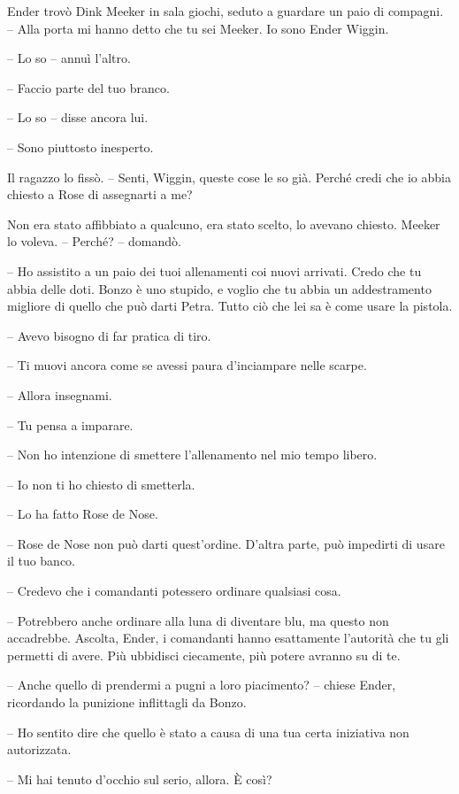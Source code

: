{Ender trovò Dink Meeker in sala giochi, seduto a guardare un paio di
	compagni. -- Alla porta mi hanno detto che tu sei Meeker. Io sono Ender
	Wiggin.}

{-- Lo so -- annuì l'altro.}

{-- Faccio parte del tuo branco.}

{-- Lo so -- disse ancora lui.}

{-- Sono piuttosto inesperto.}

{Il ragazzo lo fissò. -- Senti, Wiggin, queste cose le so già. Perché
	credi che io abbia chiesto a Rose di assegnarti a me?}

{Non era stato affibbiato a qualcuno, era stato scelto, lo avevano
	chiesto. Meeker lo voleva. -- Perché? -- domandò.}

{-- Ho assistito a un paio dei tuoi allenamenti coi nuovi arrivati.
	Credo che tu abbia delle doti. Bonzo è uno stupido, e voglio che tu
	abbia un addestramento migliore di quello che può darti Petra. Tutto ciò
	che lei sa è come usare la pistola.}

{-- Avevo bisogno di far pratica di tiro.}

{-- Ti muovi ancora come se avessi paura d'inciampare nelle scarpe.}

{-- Allora insegnami.}

{-- Tu pensa a imparare.}

{-- Non ho intenzione di smettere l'allenamento nel mio tempo libero.}

{-- Io non ti ho chiesto di smetterla.}

{-- Lo ha fatto Rose de Nose.}

{-- Rose de Nose non può darti quest'ordine. D'altra parte, può
	impedirti di usare il tuo banco.}

{-- Credevo che i comandanti potessero ordinare qualsiasi cosa.}

{-- Potrebbero anche ordinare alla luna di diventare blu, ma questo non
	accadrebbe. Ascolta, Ender, i comandanti hanno esattamente l'autorità
	che tu gli permetti di avere. Più ubbidisci ciecamente, più potere
	avranno su di te.}

{-- Anche quello di prendermi a pugni a loro piacimento? -- chiese
	Ender, ricordando la punizione inflittagli da Bonzo.}

{-- Ho sentito dire che quello è stato a causa di una tua certa
	iniziativa non autorizzata.}

{-- Mi hai tenuto d'occhio sul serio, allora. È così?}

